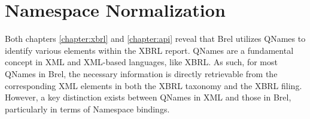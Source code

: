 \section{Namespace Normalization}
\label{sec:qnames_implementation}





Both chapters \ref{chapter:xbrl} and \ref{chapter:api} reveal that Brel utilizes QNames to identify various elements within the XBRL report.
QNames are a fundamental concept in XML and XML-based languages, like XBRL.
As such, for most QNames in Brel, the necessary information is directly retrievable from the corresponding XML elements in both the XBRL taxonomy and the XBRL filing.
However, a key distinction exists between QNames in XML and those in Brel, particularly in terms of Namespace bindings.

